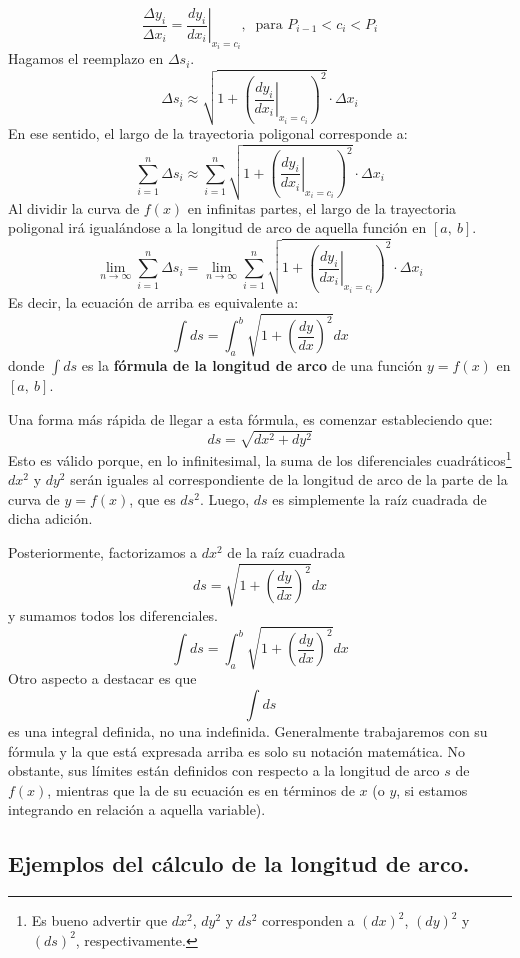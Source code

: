 \documentclass[12pt]{article}
\begin{document}
\[
  \frac{\Delta y_{i}}{\Delta x_{i}} = \left. \frac{dy_{i}}{dx_{i}} \right|_{x_{i} = c_{i}}, \ \text{ para } P_{i - 1} < c_{i} < P_{i}
\]
Hagamos el reemplazo en $\Delta s_{i}$.
\[
  \Delta s_{i} \approx \sqrt{1 + \left(\left. \frac{dy_{i}}{dx_{i}} \right|_{x_{i} = c_{i}}\right)^{2}} \cdot \Delta x_{i}
\]
En ese sentido, el largo de la trayectoria poligonal corresponde a:
\[
  \sum_{i = 1}^{n} \Delta s_{i} \approx \sum_{i = 1}^{n} \sqrt{1 + \left(\left. \frac{dy_{i}}{dx_{i}} \right|_{x_{i} = c_{i}}\right)^{2}} \cdot \Delta x_{i}
\]
Al dividir la curva de $f(x)$ en infinitas partes, el largo de la trayectoria poligonal irá igualándose a la longitud de arco de aquella función en $[a, \ b]$.
\[
\lim_{n \to \infty} \sum_{i = 1}^{n} \Delta s_{i} = 
  \lim_{n \to \infty} \sum_{i = 1}^{n} \sqrt{1 + \left(\left. \frac{dy_{i}}{dx_{i}} \right|_{x_{i} = c_{i}}\right)^{2}} \cdot \Delta x_{i}
\]
Es decir, la ecuación de arriba es equivalente a:
\[
  \int ds = \int_{a}^{b} \sqrt{1 + \left(\frac{dy}{dx}\right)^{2}} dx
\]
donde $\int ds$ es la \textbf{fórmula de la longitud de arco} de una función $y = f(x)$ en $[a, \ b]$.

Una forma más rápida de llegar a esta fórmula, es comenzar estableciendo que:
\[
  ds = \sqrt{dx^{2} + dy^{2}}
\]
Esto es válido porque, en lo infinitesimal, la suma de los diferenciales cuadráticos\footnote{Es bueno advertir que $dx^{2}$, $dy^{2}$ y $ds^{2}$ corresponden a $(dx)^{2}$, $(dy)^{2}$ y $(ds)^{2}$, respectivamente.} $dx^{2}$ y $dy^{2}$ serán iguales al correspondiente de la longitud de arco de la parte de la curva de $y = f(x)$, que es $ds^{2}$. Luego, $ds$ es simplemente la raíz cuadrada de dicha adición.

Posteriormente, factorizamos a $dx^{2}$ de la raíz cuadrada
\[
  ds = \sqrt{1 + \left(\frac{dy}{dx}\right)^{2}} dx
\]
y sumamos todos los diferenciales.
\[
  \int ds = \int_{a}^{b} \sqrt{1 + \left(\frac{dy}{dx}\right)^{2}} dx
\]
Otro aspecto a destacar es que
\[
  \int ds
\]
es una integral definida, no una indefinida. Generalmente trabajaremos con su fórmula y la que está expresada arriba es solo su notación matemática. No obstante, sus límites están definidos con respecto a la longitud de arco $s$ de $f(x)$, mientras que la de su ecuación es en términos de $x$ (o $y$, si estamos integrando en relación a aquella variable).

\subsection{Ejemplos del cálculo de la longitud de arco.}
\end{document}
